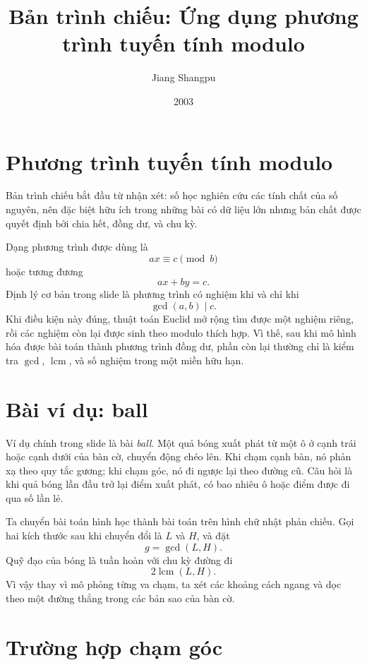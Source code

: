 \documentclass[11pt]{article}
\title{Bản trình chiếu: Ứng dụng phương trình tuyến tính modulo}
\author{Jiang Shangpu}
\date{2003}
\begin{document}
\maketitle


\section{Phương trình tuyến tính modulo}

Bản trình chiếu bắt đầu từ nhận xét: số học nghiên cứu các tính chất của số
nguyên, nên đặc biệt hữu ích trong những bài có dữ liệu lớn nhưng bản chất
được quyết định bởi chia hết, đồng dư, và chu kỳ.

Dạng phương trình được dùng là
\[
  ax\equiv c\pmod b
\]
hoặc tương đương
\[
  ax+by=c.
\]
Định lý cơ bản trong slide là phương trình có nghiệm khi và chỉ khi
\[
  \gcd(a,b)\mid c.
\]
Khi điều kiện này đúng, thuật toán Euclid mở rộng tìm được một nghiệm riêng,
rồi các nghiệm còn lại được sinh theo modulo thích hợp. Vì thế, sau khi mô
hình hóa được bài toán thành phương trình đồng dư, phần còn lại thường chỉ
là kiểm tra \(\gcd\), \(\operatorname{lcm}\), và số nghiệm trong một miền
hữu hạn.

\section{Bài ví dụ: ball}

Ví dụ chính trong slide là bài \textit{ball}. Một quả bóng xuất phát từ một
ô ở cạnh trái hoặc cạnh dưới của bàn cờ, chuyển động chéo lên. Khi chạm cạnh
bàn, nó phản xạ theo quy tắc gương; khi chạm góc, nó đi ngược lại theo đường
cũ. Câu hỏi là khi quả bóng lần đầu trở lại điểm xuất phát, có bao nhiêu ô
hoặc điểm được đi qua số lần lẻ.

Ta chuyển bài toán hình học thành bài toán trên hình chữ nhật phản chiếu. Gọi
hai kích thước sau khi chuyển đổi là \(L\) và \(H\), và đặt
\[
  g=\gcd(L,H).
\]
Quỹ đạo của bóng là tuần hoàn với chu kỳ đường đi
\[
  2\operatorname{lcm}(L,H).
\]
Vì vậy thay vì mô phỏng từng va chạm, ta xét các khoảng cách ngang và dọc
theo một đường thẳng trong các bản sao của bàn cờ.

\section{Trường hợp chạm góc}
\end{document}
